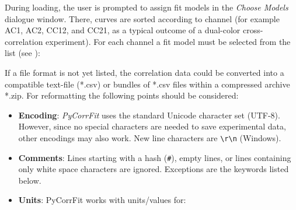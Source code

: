 During loading, the user is prompted to assign fit models in the \textit{Choose Models} dialogue window. There, curves are sorted according to channel (for example AC1, AC2, CC12, and CC21, as a typical outcome of a dual-color cross-correlation experiment). For each channel a fit model must be selected from the list (see ):

If a file format is not yet listed, the correlation data could be converted into a compatible text-file (*.csv) or bundles of *.csv files within a compressed archive *.zip. For reformatting the following points should be considered:


\begin{itemize}
\item \textbf{Encoding}: \textit{PyCorrFit} uses the standard Unicode character set (UTF-8). However, since no special characters are needed to save experimental data, other encodings may also work. New line characters are \texttt{{\textbackslash}r{\textbackslash}n} (Windows).
\item \textbf{Comments}: Lines starting with a hash (\texttt{\#}), empty lines, or lines containing only white space characters are ignored. Exceptions are the keywords listed below.
\item \textbf{Units}: PyCorrFit works with units/values for:


\end{itemize}
